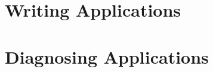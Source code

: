 \documentclass[11pt, oneside, a4paper]{book}   	%
\begin{document}





\clearpage
\setcounter{page}{1}

\tableofcontents

\listoffigures

\hypersetup{linkcolor=violet}



\part{Writing Applications}
\label{part:writing-applications}





\part{Diagnosing Applications}
\label{part:diagnosing-applictions}
















\end{document}

